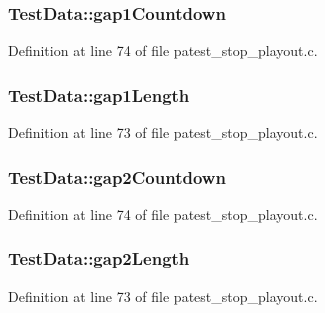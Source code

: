 \subsubsection[{\texorpdfstring{gap1\+Countdown}{gap1Countdown}}]{ Test\+Data\+::gap1\+Countdown}\hypertarget{struct_test_data_aeb2df56618bc0f5f10e8d9ada3522bcb}{}\label{struct_test_data_aeb2df56618bc0f5f10e8d9ada3522bcb}


Definition at line 74 of file patest\+\_\+stop\+\_\+playout.\+c.

\subsubsection[{\texorpdfstring{gap1\+Length}{gap1Length}}]{ Test\+Data\+::gap1\+Length}\hypertarget{struct_test_data_a4d33af02923caafa07771286273191e8}{}\label{struct_test_data_a4d33af02923caafa07771286273191e8}


Definition at line 73 of file patest\+\_\+stop\+\_\+playout.\+c.

\subsubsection[{\texorpdfstring{gap2\+Countdown}{gap2Countdown}}]{ Test\+Data\+::gap2\+Countdown}\hypertarget{struct_test_data_a1941e96206c94d50930d43b9178acd84}{}\label{struct_test_data_a1941e96206c94d50930d43b9178acd84}


Definition at line 74 of file patest\+\_\+stop\+\_\+playout.\+c.

\subsubsection[{\texorpdfstring{gap2\+Length}{gap2Length}}]{ Test\+Data\+::gap2\+Length}\hypertarget{struct_test_data_a68e2762980970d5a103cff73cadfa4b9}{}\label{struct_test_data_a68e2762980970d5a103cff73cadfa4b9}


Definition at line 73 of file patest\+\_\+stop\+\_\+playout.\+c.

